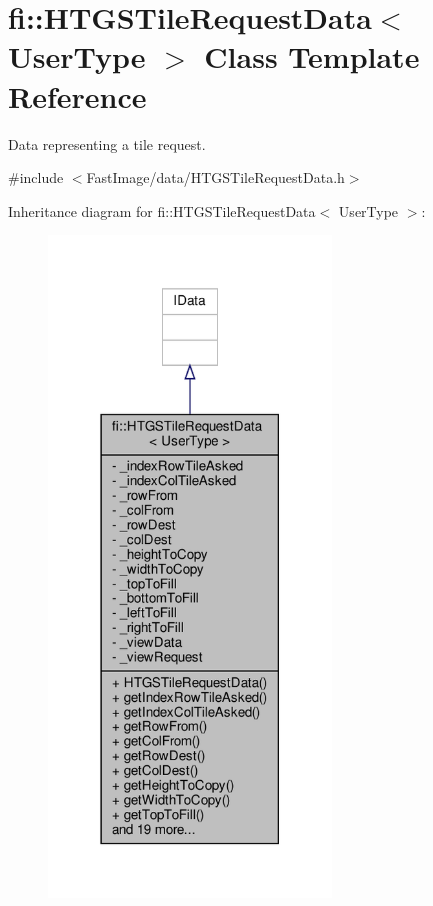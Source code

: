 \hypertarget{classfi_1_1HTGSTileRequestData}{}\section{fi\+:\+:H\+T\+G\+S\+Tile\+Request\+Data$<$ User\+Type $>$ Class Template Reference}
\label{classfi_1_1HTGSTileRequestData}


Data representing a tile request.  




{\ttfamily \#include $<$Fast\+Image/data/\+H\+T\+G\+S\+Tile\+Request\+Data.\+h$>$}



Inheritance diagram for fi\+:\+:H\+T\+G\+S\+Tile\+Request\+Data$<$ User\+Type $>$\+:
\nopagebreak
\begin{figure}[H]
\begin{center}
\leavevmode
\includegraphics[width=213pt]{dc/da5/classfi_1_1HTGSTileRequestData__inherit__graph}
\end{center}
\end{figure}


